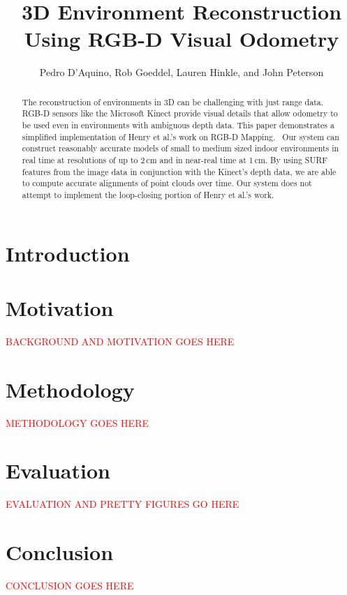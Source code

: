 \documentclass[letterpaper, 10pt, conference]{ieeeconf}
\title{\LARGE \bf
    3D Environment Reconstruction Using RGB-D Visual Odometry
}
\author{Pedro D'Aquino, Rob Goeddel, Lauren Hinkle, and John Peterson}
\newcommand{\xxx}[1]{\textcolor{red}{#1}}
\begin{document}
\maketitle
\thispagestyle{empty}
\pagestyle{empty}

\begin{abstract}
The reconstruction of environments in 3D can be challenging with just range
data. RGB-D sensors like the Microsoft Kinect provide visual details that
allow odometry to be used even in environments with ambiguous depth data.
This paper demonstrates a simplified implementation of Henry et al.'s work
on RGB-D Mapping.~\cite{Henry10rgbd}
Our system can construct reasonably accurate models of
small to medium sized indoor environments in real time at resolutions of up
to 2\,cm and in near-real time at 1\,cm. By using SURF features from the image
data in conjunction with the Kinect's depth data, we are able to compute
accurate alignments of point clouds over time. Our system does not attempt to
implement the loop-closing portion of Henry et al.'s work.
\end{abstract}

\section{Introduction}


\section{Motivation}
\xxx{BACKGROUND AND MOTIVATION GOES HERE}

\section{Methodology}
\xxx{METHODOLOGY GOES HERE}

\section{Evaluation}
\xxx{EVALUATION AND PRETTY FIGURES GO HERE}

\section{Conclusion}
\xxx{CONCLUSION GOES HERE}



\end{document}
